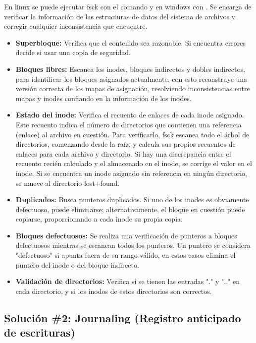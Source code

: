 \documentclass[openany]{book}
\begin{document}
En linux se puede ejecutar fsck con el comando  y en windows con . Se encarga de verificar la información de las estructuras de datos del sistema de archivos y corregir cualquier inconsistencia que encuentre. 

\begin{itemize}
    \item \textbf{Superbloque:} Verifica que el contenido sea razonable. Si encuentra errores decide si usar una copia de seguridad.
    \item \textbf{Bloques libres:} Escanea los inodes, bloques indirectos y dobles indirectos, para identificar los bloques asignados actualmente, con esto reconstruye una versión correcta de los mapas de asignación, resolviendo inconsistencias entre mapas y inodes confiando en la información de los inodes.
    \item \textbf{Estado del inode:} Verifica el recuento de enlaces de cada inode asignado. Este recuento indica el número de directorios que contienen una referencia (enlace) al archivo en cuestión. Para verificarlo, fsck escanea todo el árbol de directorios, comenzando desde la raíz, y calcula sus propios recuentos de enlaces para cada archivo y directorio. Si hay una discrepancia entre el recuento recién calculado y el almacenado en el inode, se corrige el valor en el inode. Si se encuentra un inode asignado sin referencia en ningún directorio, se mueve al directorio lost+found.
    \item \textbf{Duplicados:} Busca punteros duplicados. Si uno de los inodes es obviamente defectuoso, puede eliminarse; alternativamente, el bloque en cuestión puede copiarse, proporcionando a cada inode su propia copia.
    \item \textbf{Bloques defectuosos:} Se realiza una verificación de punteros a bloques defectuosos mientras se escanean todos los punteros. Un puntero se considera "defectuoso" si apunta fuera de su rango válido, en estos casos elimina el puntero del inode o del bloque indirecto.
    \item \textbf{Validación de directorios:} Verifica si se tienen las entradas "." y ".." en cada directorio, y si los inodos de estos directorios son correctos.
\end{itemize}

\subsection{Solución \#2: Journaling (Registro anticipado de escrituras)}
\end{document}
